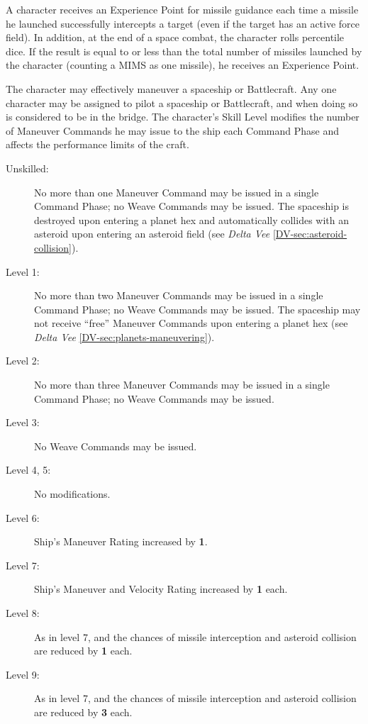 A character receives an Experience Point for missile guidance each
time a missile he launched successfully intercepts a target (even if
the target has an active force field).  In addition, at the end of a
space combat, the character rolls percentile dice.  If the result is
equal to or less than the total number of missiles launched by the
character (counting a MIMS as one missile), he receives an Experience
Point.

\label{sec:skill-pilot}

The character may effectively maneuver a spaceship or Battlecraft.  Any
one character may be assigned to pilot a spaceship or Battlecraft, and
when doing so is considered to be in the bridge.  The character's Skill
Level modifies the number of Maneuver Commands he may issue to the
ship each Command Phase and affects the performance limits of the
craft.

\begin{description}
\item[Unskilled:] No more than one Maneuver Command may be issued in a
  single Command Phase; no Weave Commands may be issued.  The spaceship
  is destroyed upon entering a planet hex and automatically collides
  with an asteroid upon entering an asteroid field (see
  \emph{Delta Vee} \ref{DV-sec:asteroid-collision}).
\item[Level 1:] No more than two Maneuver Commands may be issued in a
  single Command Phase; no Weave Commands may be issued.  The spaceship
  may not receive ``free'' Maneuver Commands upon entering a planet
  hex (see \emph{Delta Vee} \ref{DV-sec:planets-maneuvering}).
\item[Level 2:] No more than three Maneuver Commands may be issued in
  a single Command Phase; no Weave Commands may be issued.
\item[Level 3:] No Weave Commands may be issued.
\item[Level 4, 5:] No modifications.
\item[Level 6:] Ship's Maneuver Rating increased by \textbf{1}.
\item[Level 7:] Ship's Maneuver and Velocity Rating increased by
  \textbf{1} each.
\item[Level 8:] As in level 7, and the chances of missile interception
  and asteroid collision are reduced by \textbf{1} each.
\item[Level 9:] As in level 7, and the chances of missile interception
  and asteroid collision are reduced by \textbf{3} each.
\end{description}

